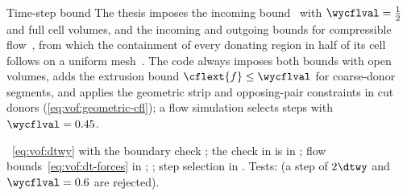 \begin{deviation}{Time-step bound}
The thesis imposes the incoming bound~ with
$\wycflval=\half$ and full cell volumes, and the incoming and outgoing bounds
for compressible flow~, from which the containment of every
donating region in half of its cell follows on a uniform mesh~.
The code always imposes both bounds with open volumes, adds the extrusion
bound $\cflext{f}\le\wycflval$ for coarse-donor segments, and applies
the geometric strip and opposing-pair constraints in cut donors
(\cref{eq:vof:geometric-cfl}); a flow simulation selects steps with
$\wycflval=0.45$.
\end{deviation}

\begin{implnote}
~\cref{eq:vof:dtwy}
with the boundary check ;
the check in  is in ;
flow bounds~\cref{eq:vof:dt-forces} in
;
; step
selection in . Tests:
(a step of $2\dtwy$ and $\wycflval=0.6$ are rejected).
\end{implnote}


